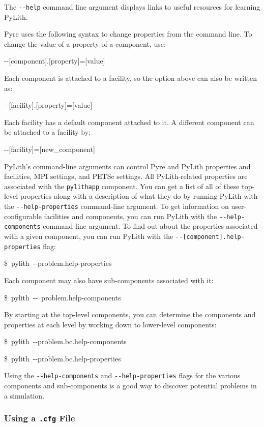 The \texttt{-{}-help} command line argument displays links to useful
resources for learning PyLith.

Pyre uses the following syntax to change properties from the command
line. To change the value of a property of a component, use:
\begin{lyxcode}
-{}-{[}component{]}.{[}property{]}={[}value{]}
\end{lyxcode}
Each component is attached to a facility, so the option above can
also be written as: 
\begin{lyxcode}
-{}-{[}facility{]}.{[}property{]}={[}value{]}
\end{lyxcode}
Each facility has a default component attached to it. A different
component can be attached to a facility by:
\begin{lyxcode}
-{}-{[}facility{]}={[}new\_component{]}~
\end{lyxcode}
PyLith's command-line arguments can control Pyre and PyLith properties
and facilities, MPI settings, and PETSc settings. All PyLith-related
properties are associated with the \texttt{pylithapp} component. You
can get a list of all of these top-level properties along with a description
of what they do by running PyLith with the \texttt{-{}-help-properties}
command-line argument. To get information on user-configurable facilities
and components, you can run PyLith with the \texttt{-{}-help-components}
command-line argument. To find out about the properties associated
with a given component, you can run PyLith with the \texttt{-{}-{[}component{]}.help-properties}
flag:
\begin{lyxcode}
\$~pylith~-{}-problem.help-properties
\end{lyxcode}
Each component may also have sub-components associated with it:
\begin{lyxcode}
\$~pylith~-{}-~problem.help-components
\end{lyxcode}
By starting at the top-level components, you can determine the components
and properties at each level by working down to lower-level components:
\begin{lyxcode}
\$~pylith~-{}-problem.bc.help-components

\$~pylith~-{}-problem.bc.help-properties
\end{lyxcode}
Using the \texttt{-{}-help-components} and \texttt{-{}-help-properties}
flags for the various components and sub-components is a good way
to discover potential problems in a simulation.


\subsubsection{Using a \texttt{.cfg} File}


